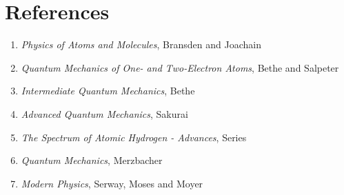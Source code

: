\documentclass[a4paper]{serif}
\begin{document}
    \section{References}
    \begin{enumerate}
        \item \emph{Physics of Atoms and Molecules}, Bransden and Joachain
        \item \emph{Quantum Mechanics of One- and Two-Electron Atoms},
                    Bethe and Salpeter
        \item \emph{Intermediate Quantum Mechanics}, Bethe
        \item \emph{Advanced Quantum Mechanics}, Sakurai
        \item \emph{The Spectrum of Atomic Hydrogen - Advances}, Series
        \item \emph{Quantum Mechanics}, Merzbacher
        \item \emph{Modern Physics}, Serway, Moses and Moyer
    \end{enumerate}

\end{document}
